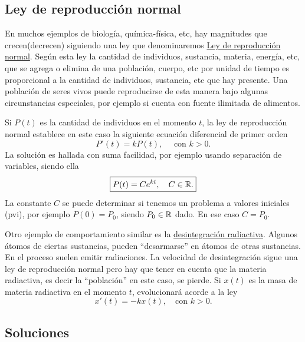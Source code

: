 \subsection{Ley de reproducción normal}
  En muchos ejemplos de biología, química-física, etc, hay magnitudes que crecen(decrecen) siguiendo una ley que denominaremos
\href{http://es.wikipedia.org/wiki/Crecimiento_exponencial}{Ley de reproducción  normal}. Según esta ley la cantidad de individuos, sustancia, materia,
energía, etc, que se agrega o elimina de una población, cuerpo, etc por unidad de tiempo es proporcional a la cantidad de individuos, sustancia, etc que hay presente.   Una población de seres vivos puede reproducirse de esta manera bajo algunas circunstancias
especiales, por ejemplo si cuenta con fuente ilimitada de alimentos.

  Si $P(t)$ es la cantidad de individuos en el momento $t$, la ley de reproducción normal establece
en este caso la siguiente ecuación diferencial de primer orden
\[P'(t)=kP(t),\quad\text{ con } k>0.\]
La solución es hallada con suma facilidad, por ejemplo usando separación de variables, siendo ella
\[\boxed{P(t)=Ce^{kt},\quad C\in\rr.}\]
La constante  $C$ se puede determinar si tenemos un problema a valores iniciales (pvi), por ejemplo $P(0)=P_0$, siendo $P_0\in\rr$ dado. En ese caso
$C=P_0$.



  Otro ejemplo de comportamiento similar es la \href{http://es.wikipedia.org/wiki/Radiactividad}{desintegración radiactiva}. Algunos átomos de
ciertas sustancias, pueden ``desarmarse'' en átomos de otras sustancias. En el proceso suelen emitir radiaciones.  La velocidad de desintegración sigue una ley
de reproducción normal pero hay que tener en cuenta que la materia radiactiva, es decir la ``población''  en este caso, se pierde. Si $x(t)$ es la masa de materia radiactiva en el momento $t$, evolucionará
acorde a la ley
\[\boxed{x'(t)=-kx(t),\quad\text{con } k>0.}\]



\subsection{Soluciones}

